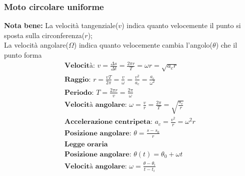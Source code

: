 \subsubsection{Moto circolare uniforme}
\textbf{Nota bene: } La velocità tangenziale($v$) indica quanto velocemente il punto si sposta sulla circonferenza($r$); \\
La velocità angolare($\Omega$) indica quanto velocemente cambia l'angolo($\theta$) che il punto forma
\begin{gather*}
 \textbf{Velocità: } v = \frac{\Delta s}{\Delta t} = \frac{2 \pi r}{T} = \omega r = \sqrt{a_c r} \\
\textbf{Raggio: } r = \frac{v T}{2 \pi} = \frac{v}{\omega} = \frac{v^2}{a_c} = \frac{a_c}{\omega^2} \\
\textbf{Periodo: } T = \frac{2 \pi r}{v} = \frac{2 \pi}{\omega} \\
\textbf{Velocità angolare: } \omega = \frac{v}{r} = \frac{2 \pi}{T} = \sqrt{\frac{a_c}{r}} \\
\textbf{Accelerazione centripeta: } a_c = \frac{v^2}{r} = \omega^2 r \\
\textbf{Posizione angolare: } \theta = \frac{s - s_0}{r} \\
\textbf{Legge oraria} \\
\textbf{Posizione angolare: } \theta(t) = \theta_0 + \omega t \\
\textbf{Velocità angolare: } \omega = \frac{\theta - \theta_i}{t - t_i}
\end{gather*}

